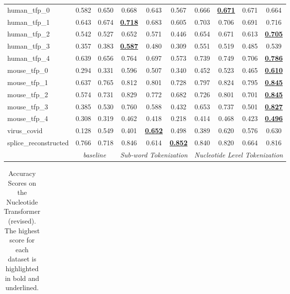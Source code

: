 \begin{table*}[h!]
\begin{center}
\begin{tabular}{l|cc|ccc|cccc}
human\_tfp\_0 & 0.582 & 0.650 & 0.668 & 0.643 & 0.567 & 0.666 & {\ul \textbf{0.671}} & 0.671 & 0.664 \\
human\_tfp\_1 & 0.643 & 0.674 & {\ul \textbf{0.718}} & 0.683 & 0.605 & 0.703 & 0.706 & 0.691 & 0.716 \\
human\_tfp\_2 & 0.542 & 0.527 & 0.652 & 0.571 & 0.446 & 0.654 & 0.671 & 0.613 & {\ul \textbf{0.705}} \\
human\_tfp\_3 & 0.357 & 0.383 & {\ul \textbf{0.587}} & 0.480 & 0.309 & 0.551 & 0.519 & 0.485 & 0.539 \\
human\_tfp\_4 & 0.639 & 0.656 & 0.764 & 0.697 & 0.573 & 0.739 & 0.749 & 0.706 & {\ul \textbf{0.786}} \\
mouse\_tfp\_0 & 0.294 & 0.331 & 0.596 & 0.507 & 0.340 & 0.452 & 0.523 & 0.465 & {\ul \textbf{0.610}} \\
mouse\_tfp\_1 & 0.637 & 0.765 & 0.812 & 0.801 & 0.728 & 0.797 & 0.824 & 0.795 & {\ul \textbf{0.845}} \\
mouse\_tfp\_2 & 0.574 & 0.731 & 0.829 & 0.772 & 0.682 & 0.726 & 0.801 & 0.701 & {\ul \textbf{0.845}} \\
mouse\_tfp\_3 & 0.385 & 0.530 & 0.760 & 0.588 & 0.432 & 0.653 & 0.737 & 0.501 & {\ul \textbf{0.827}} \\
mouse\_tfp\_4 & 0.308 & 0.319 & 0.462 & 0.418 & 0.218 & 0.414 & 0.468 & 0.423 & {\ul \textbf{0.496}} \\
virus\_covid & 0.128 & 0.549 & 0.401 & {\ul \textbf{0.652}} & 0.498 & 0.389 & 0.620 & 0.576 & 0.630 \\
splice\_reconstructed & 0.766 & 0.718 & 0.846 & 0.614 & {\ul \textbf{0.852}} & 0.840 & 0.820 & 0.664 & 0.816 \\
\hline
\multicolumn{1}{l|}{} & \multicolumn{2}{c|}{\textit{baseline}} & \multicolumn{3}{c|}{\textit{Sub-word Tokenization}} & \multicolumn{4}{c}{\textit{Nucleotide Level Tokenization}} \\ \hline
\end{tabular}
\end{center}
\end{table*}\begin{table*}[h!]
\small
\begin{center}
\caption{Accuracy Scores on the Nucleotide Transformer (revised). The highest score for each dataset is highlighted in bold and underlined.}
\label{table: NTv2 Results ACCURACY}
\begin{tabular}{l|cc|ccc|cccc}
\hline

\end{tabular}
\end{center}
\end{table*}
